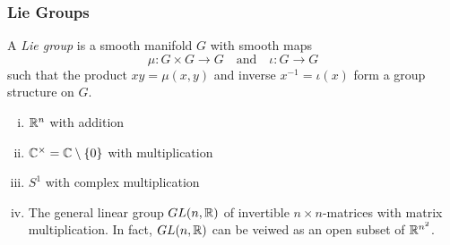 \begin{frame}
  \frametitle{Lie Groups}
  \begin{defn}
    A {\em Lie group} is a smooth manifold $G$
    with smooth maps
    \begin{displaymath}
      \mu \colon G \times G \to G \quad \text{and}
      \quad \iota \colon G \to G
    \end{displaymath}
    such that the product $xy = \mu(x, y)$ and inverse $x^{-1} = \iota (x)$
    form a group structure on $G$.
  \end{defn}
  \begin{example}
    \begin{enumerate}[(i)]
      \item $\mathbb R^n$ with addition 
      \item $\mathbb C^\times = \mathbb C \setminus \{0\}$ with multiplication
      \item $S^1$ with complex multiplication
      \item The general linear group $GL(n, \mathbb R)$ of invertible 
        $n \times n$-matrices with matrix multiplication. In fact, 
        $GL(n, \mathbb R)$ can be veiwed as an open subset of $\mathbb R^{n^2}$.
    \end{enumerate}
  \end{example}
\end{frame}
